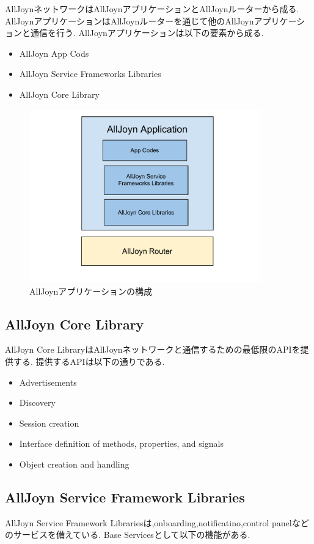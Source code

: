AllJoynネットワークはAllJoynアプリケーションとAllJoynルーターから成る.
AllJoynアプリケーションはAllJoynルーターを通じて他のAllJoynアプリケーションと通信を行う.
AllJoynアプリケーションは以下の要素から成る.

\begin{itemize}
\item AllJoyn App Cods
\item AllJoyn Service Frameworks Libraries
\item AllJoyn Core Library
\end{itemize}

\begin{figure}[htbp]
\centering
\includegraphics[width=10cm]{fig/AllJoyn.pdf}
\caption{AllJoynアプリケーションの構成}
\end{figure}

\subsection{AllJoyn Core Library}
AllJoyn Core LibraryはAllJoynネットワークと通信するための最低限のAPIを提供する.
提供するAPIは以下の通りである.

\begin{itemize}
\item Advertisements
\item Discovery
\item Session creation
\item Interface definition of methods, properties, and signals
\item Object creation and handling
\end{itemize}

\subsection{AllJoyn Service Framework Libraries}
AllJoyn Service Framework Librariesは,onboarding,notificatino,control panelなどのサービスを備えている.
Base Servicesとして以下の機能がある.

